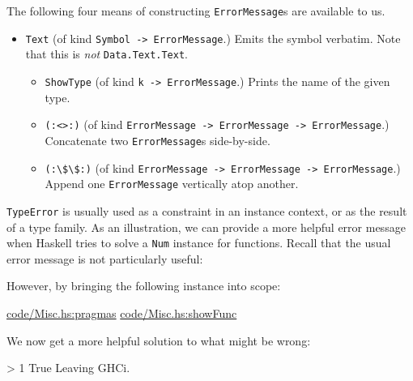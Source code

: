 \documentclass[
  11pt,
]{book}
\newenvironment{Shaded}{}{}
\newcommand{\DataTypeTok}[1]{\textcolor[rgb]{0.56,0.13,0.00}{#1}}
\newcommand{\DecValTok}[1]{\textcolor[rgb]{0.25,0.63,0.44}{#1}}
\newcommand{\OperatorTok}[1]{\textcolor[rgb]{0.40,0.40,0.40}{#1}}
\providecommand{\tightlist}{%
  \setlength{\itemsep}{0pt}\setlength{\parskip}{0pt}}
\theoremstyle{nonumberplain}
\begin{document}
The following four means of constructing \texttt{ErrorMessage}s are
available to us.

\begin{itemize}
\tightlist
\item
  \texttt{\textquotesingle{}Text} (of kind
  \texttt{Symbol\ -\textgreater{}\ ErrorMessage}.) Emits the symbol
  verbatim. Note that this is \emph{not} \texttt{Data.Text.Text}.

  \begin{itemize}
  \tightlist
  \item
    \texttt{\textquotesingle{}ShowType} (of kind
    \texttt{k\ -\textgreater{}\ ErrorMessage}.) Prints the name of the
    given type.
  \item
    \texttt{\textquotesingle{}(:\textless{}\textgreater{}:)} (of kind
    \texttt{ErrorMessage\ -\textgreater{}\ ErrorMessage\ -\textgreater{}\ ErrorMessage}.)
    Concatenate two \texttt{ErrorMessage}s side-by-side.
  \item
    \texttt{\textquotesingle{}(:\textbackslash{}\$\textbackslash{}\$:)}
    (of kind
    \texttt{ErrorMessage\ -\textgreater{}\ ErrorMessage\ -\textgreater{}\ ErrorMessage}.)
    Append one \texttt{ErrorMessage} vertically atop another.
  \end{itemize}
\end{itemize}

\texttt{TypeError} is usually used as a constraint in an instance
context, or as the result of a type family. As an illustration, we can
provide a more helpful error message when Haskell tries to solve a
\texttt{Num} instance for functions. Recall that the usual error message
is not particularly useful:

\begin{Shaded}
\begin{Highlighting}[]

\end{Highlighting}
\end{Shaded}

However, by bringing the following instance into scope:

\href{Snip}{code/Misc.hs:pragmas} \href{Snip}{code/Misc.hs:showFunc}

We now get a more helpful solution to what might be wrong:

\begin{Shaded}
\begin{Highlighting}[]
\OperatorTok{\textgreater{}} \DecValTok{1} \DataTypeTok{True}
\DataTypeTok{Leaving} \DataTypeTok{GHCi}\OperatorTok{.}
\end{Highlighting}
\end{Shaded}
\end{document}
